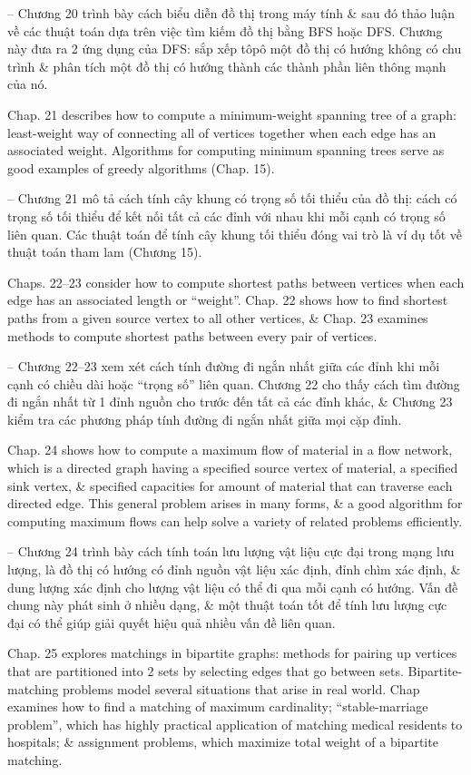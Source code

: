 \documentclass{article}
\begin{document}
\begin{itemize}
\begin{itemize}
		-- Chương 20 trình bày cách biểu diễn đồ thị trong máy tính \& sau đó thảo luận về các thuật toán dựa trên việc tìm kiếm đồ thị bằng BFS hoặc DFS. Chương này đưa ra 2 ứng dụng của DFS: sắp xếp tôpô một đồ thị có hướng không có chu trình \& phân tích một đồ thị có hướng thành các thành phần liên thông mạnh của nó.
		
		Chap. 21 describes how to compute a minimum-weight spanning tree of a graph: least-weight way of connecting all of vertices together when each edge has an associated weight. Algorithms for computing minimum spanning trees serve as good examples of greedy algorithms (Chap. 15).
		
		-- Chương 21 mô tả cách tính cây khung có trọng số tối thiểu của đồ thị: cách có trọng số tối thiểu để kết nối tất cả các đỉnh với nhau khi mỗi cạnh có trọng số liên quan. Các thuật toán để tính cây khung tối thiểu đóng vai trò là ví dụ tốt về thuật toán tham lam (Chương 15).
		
		Chaps. 22--23 consider how to compute shortest paths between vertices when each edge has an associated length or ``weight''. Chap. 22 shows how to find shortest paths from a given source vertex to all other vertices, \& Chap. 23 examines methods to compute shortest paths between every pair of vertices.
		
		-- Chương 22--23 xem xét cách tính đường đi ngắn nhất giữa các đỉnh khi mỗi cạnh có chiều dài hoặc ``trọng số'' liên quan. Chương 22 cho thấy cách tìm đường đi ngắn nhất từ 1 đỉnh nguồn cho trước đến tất cả các đỉnh khác, \& Chương 23 kiểm tra các phương pháp tính đường đi ngắn nhất giữa mọi cặp đỉnh.
		
		Chap. 24 shows how to compute a maximum flow of material in a flow network, which is a directed graph having a specified source vertex of material, a specified sink vertex, \& specified capacities for amount of material that can traverse each directed edge. This general problem arises in many forms, \& a good algorithm for computing maximum flows can help solve a variety of related problems efficiently.
		
		-- Chương 24 trình bày cách tính toán lưu lượng vật liệu cực đại trong mạng lưu lượng, là đồ thị có hướng có đỉnh nguồn vật liệu xác định, đỉnh chìm xác định, \& dung lượng xác định cho lượng vật liệu có thể đi qua mỗi cạnh có hướng. Vấn đề chung này phát sinh ở nhiều dạng, \& một thuật toán tốt để tính lưu lượng cực đại có thể giúp giải quyết hiệu quả nhiều vấn đề liên quan.
		
		Chap. 25 explores matchings in bipartite graphs: methods for pairing up vertices that are partitioned into 2 sets by selecting edges that go between sets. Bipartite-matching problems model several situations that arise in real world. Chap examines how to find a matching of maximum cardinality; ``stable-marriage problem'', which has highly practical application of matching medical residents to hospitals; \& assignment problems, which maximize total weight of a bipartite matching.
		

\end{itemize}
\end{itemize}
\end{document}
